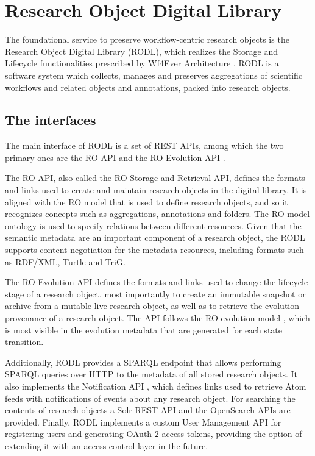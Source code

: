 \section{Research Object Digital Library}
\label{sec:rodl}


The foundational service to preserve workflow-centric research objects is the Research Object Digital Library (RODL), which realizes the Storage and Lifecycle functionalities prescribed by Wf4Ever Architecture \cite{w4fever_d132}. RODL is a software system which collects, manages and preserves aggregations of scientific workflows and related objects and annotations, packed into research objects.


\subsection{The interfaces}

The main interface of RODL is a set of REST APIs, among which the two primary ones are the RO API \cite{RO-API} and the RO Evolution API \cite{RO-EVO-API}.

The RO API, also called the RO Storage and Retrieval API, defines the formats and links used to create and maintain research objects in the digital library. It is aligned with the RO model that is used to define research objects, and so it recognizes concepts such as aggregations, annotations and folders. The RO model ontology \cite{RO_model} is used to specify relations between different resources. Given that the semantic metadata are an important component of a research object, the RODL supports content negotiation for the metadata resources, including formats such as RDF/XML, Turtle and TriG.

The RO Evolution API defines the formats and links used to change the lifecycle stage of a research object, most importantly to create an immutable snapshot or archive from a mutable live research object, as well as to retrieve the evolution provenance of a research object. The API follows the RO evolution model \cite{w4fever_d321}, which is most visible in the evolution metadata that are generated for each state transition.

Additionally, RODL provides a SPARQL endpoint that allows performing SPARQL queries over HTTP to the metadata of all stored research objects. It also implements the Notification API \cite{Notification-API}, which defines links used to retrieve Atom feeds with notifications of events about any research object. For searching the contents of research objects a Solr REST API and the OpenSearch APIs are provided. Finally, RODL implements a custom User Management API \cite{UM-API} for registering users and generating OAuth 2 access tokens, providing the option of extending it with an access control layer in the future.




